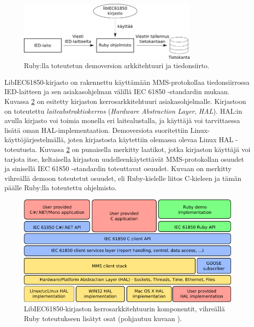\begin{figure}[ht!]
	\includegraphics[width=0.8\textwidth]{pictures/demo-architecture.png}
	\caption{Ruby:lla toteutetun demoversion arkkitehtuuri ja tiedonsiirto.}
	\label{fig:demo-architecture}
\end{figure}

LibIEC61850-kirjasto on rakennettu käyttämään MMS-protokollaa tiedonsiirrossa IED-laitteen ja sen asiakasohjelman välillä IEC 61850 -standardin mukaan. Kuvassa \ref{fig:libiec61850-layer-architecture} on esitetty kirjaston kerrosarkkitehtuuri asiakasohjelmalle. Kirjastoon on toteutettu \emph{laiteabstraktiokerros} (\emph{Hardware Abstraction Layer}, \emph{HAL}). HAL:in avulla kirjasto voi toimia monella eri laitealustalla, ja käyttäjä voi tarvittaessa lisätä oman HAL-implementaation. Demoversiota suoritettiin Linux-käyttöjärjestelmällä, joten kirjastosta käytettiin olemassa olevaa Linux HAL -toteutusta. Kuvassa \ref{fig:libiec61850-layer-architecture} on punaisella merkitty laatikot, jotka kirjaston käyttäjä voi tarjota itse, keltaisella kirjaston uudelleenkäytettävät MMS-protokollan osuudet ja sinisellä IEC 61850 -standardin toteuttavat osuudet. Kuvaan on merkitty vihreällä demoon toteutetut osuudet, eli Ruby-kielelle liitos C-kieleen ja tämän päälle Ruby:lla toteutettu ohjelmisto.

\begin{figure}[ht!]
	\includegraphics[width=1\textwidth]{pictures/libiec61850-layer-architecture.png}
	\caption{LibIEC61850-kirjaston kerrosarkkitehtuurin komponentit, vihreällä Ruby toteutukseen lisätyt osat (pohjautuu kuvaan \mbox{\cite{libIEC61850-api-overview}}).}
	\label{fig:libiec61850-layer-architecture}
\end{figure}

